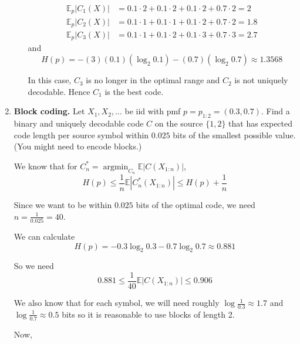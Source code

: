 \documentclass[11pt]{report}
\DeclareMathOperator*{\argmin}{\arg\min}
\newcommand{\E}{\mathbb{E}}
\newcommand{\abs}[1]{\left\vert #1 \right\vert}
\begin{document}
\begin{enumerate}[1.]
\begin{enumerate}
                    \color{blue}
                    \begin{align*}
                        \E_p\abs{C_1(X)} & = 0.1\cdot 2 + 0.1\cdot 2 + 0.1\cdot 2 + 0.7\cdot 2 = \boxed{2}   \\
                        \E_p\abs{C_2(X)} & = 0.1\cdot 1 + 0.1\cdot 1 + 0.1\cdot 2 + 0.7\cdot 2 = \boxed{1.8} \\
                        \E_p\abs{C_3(X)} & = 0.1\cdot 1 + 0.1\cdot 2 + 0.1\cdot 3 + 0.7\cdot 3 = \boxed{2.7}
                    \end{align*}
                    and
                    \[H(p) = -(3)(0.1)(\log_2 0.1) - (0.7)(\log_2 0.7) \approx 1.3568 \]

                    In this case, $C_3$ is no longer in the optimal range and $C_2$ is not uniquely decodable. Hence $C_1$ is the best code.
                    \color{black}


          \end{enumerate}






          \pagebreak

    \item {\bf Block coding.} Let $X_1,X_2,\dotsc$ be iid with pmf $p=p_{1:2}=(0.3,0.7)$. Find a binary and uniquely decodable code $C$ on the source $\{1,2\}$ that has expected code length per source symbol within $0.025$ bits of the smallest possible value. (You might need to encode blocks.)

          \color{blue}
          We know that for $C_n^* = \argmin_{C_n} \E\abs{C(X_{1:n})}$,
          \[H(p) \leq \frac{1}{n}\E\abs{C^*_n(X_{1:n})} \leq H(p) + \frac{1}{n}\]

          Since we want to be within $0.025$ bits of the optimal code, we need $n = \frac{1}{0.025} = 40$.

          We can calculate
          \[H(p) = -0.3\log_2 0.3 - 0.7\log_2 0.7 \approx 0.881\]

          So we need
          \[0.881 \leq \frac{1}{40} \E\abs{C(X_{1:n})} \leq 0.906\]

          We also know that for each symbol, we will need roughly $\log \frac{1}{0.3} \approx 1.7$ and $\log \frac{1}{0.7} \approx 0.5$ bits so it is reasonable to use blocks of length 2.

          Now,


\end{enumerate}
\end{document}
